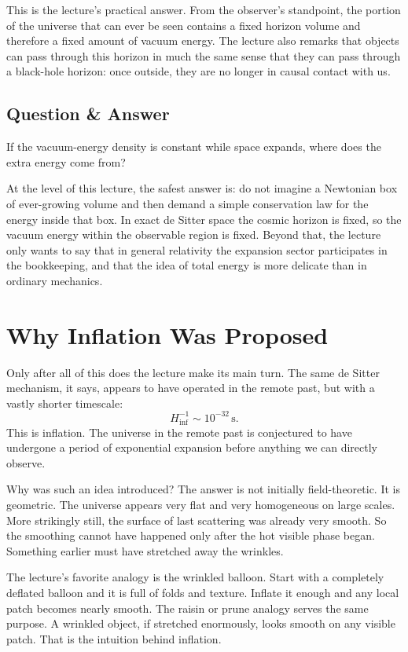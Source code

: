 This is the lecture's practical answer. From the observer's standpoint, the portion of the universe that can ever be seen contains a fixed horizon volume and therefore a fixed amount of vacuum energy. The lecture also remarks that objects can pass through this horizon in much the same sense that they can pass through a black-hole horizon: once outside, they are no longer in causal contact with us.

\subsection{Question \& Answer}

If the vacuum-energy density is constant while space expands, where does the extra energy come from?

At the level of this lecture, the safest answer is: do not imagine a Newtonian box of ever-growing volume and then demand a simple conservation law for the energy inside that box. In exact de Sitter space the cosmic horizon is fixed, so the vacuum energy within the observable region is fixed. Beyond that, the lecture only wants to say that in general relativity the expansion sector participates in the bookkeeping, and that the idea of total energy is more delicate than in ordinary mechanics.

\section{Why Inflation Was Proposed}

Only after all of this does the lecture make its main turn. The same de Sitter mechanism, it says, appears to have operated in the remote past, but with a vastly shorter timescale:
\begin{equation}
H_{\mathrm{inf}}^{-1}\sim 10^{-32}\,\mathrm{s}.
\end{equation}
This is inflation. The universe in the remote past is conjectured to have undergone a period of exponential expansion before anything we can directly observe.

Why was such an idea introduced? The answer is not initially field-theoretic. It is geometric. The universe appears very flat and very homogeneous on large scales. More strikingly still, the surface of last scattering was already very smooth. So the smoothing cannot have happened only after the hot visible phase began. Something earlier must have stretched away the wrinkles.

The lecture's favorite analogy is the wrinkled balloon. Start with a completely deflated balloon and it is full of folds and texture. Inflate it enough and any local patch becomes nearly smooth. The raisin or prune analogy serves the same purpose. A wrinkled object, if stretched enormously, looks smooth on any visible patch. That is the intuition behind inflation.

